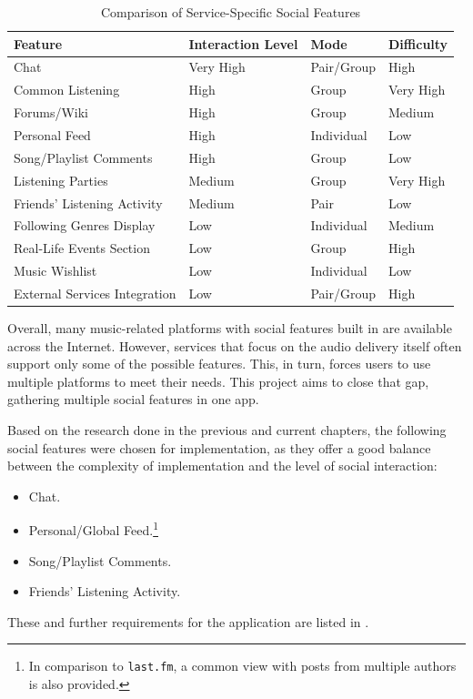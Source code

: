 \begin{table}[H]
    \centering
    \caption{Comparison of Service-Specific Social Features}
    \label{tab:social_features}
    \begin{tabularx}{\textwidth}{lXXX}
        \toprule
        \textbf{Feature} & \textbf{Interaction Level} & \textbf{Mode} & \textbf{Difficulty} \\
        \midrule
        Chat                          & Very High & Pair/Group        & High      \\
        Common Listening              & High      & Group       & Very High \\
        Forums/Wiki                   & High      & Group       & Medium    \\
        Personal Feed                & High      & Individual  & Low       \\
        Song/Playlist Comments        & High      & Group       & Low       \\
        Listening Parties             & Medium    & Group       & Very High \\
        Friends' Listening Activity   & Medium    & Pair        & Low       \\
        Following Genres Display      & Low       & Individual  & Medium    \\
        Real-Life Events Section      & Low       & Group       & High      \\
        Music Wishlist                & Low       & Individual  & Low       \\
        External Services Integration & Low       & Pair/Group  & High      \\
        \bottomrule
    \end{tabularx}
\end{table}

Overall, many music-related platforms with social
features built in are available across the Internet.
However, services that focus on the audio delivery itself often support only some of the
possible features.
This, in turn, forces users to use multiple platforms to meet their needs.
This project aims to close that gap, gathering multiple social features in one app.

Based on the research done in the previous and current chapters, the following social features were chosen
for implementation, as they offer a good balance between the complexity of implementation
and the level of social interaction:

\begin{itemize}
    \item Chat.
    \item Personal/Global Feed.\footnote{In comparison to \texttt{last.fm}, a common view with posts
    from multiple authors is also provided.}
    \item Song/Playlist Comments.
    \item Friends' Listening Activity.
\end{itemize}

These and further requirements for the application are listed in .
